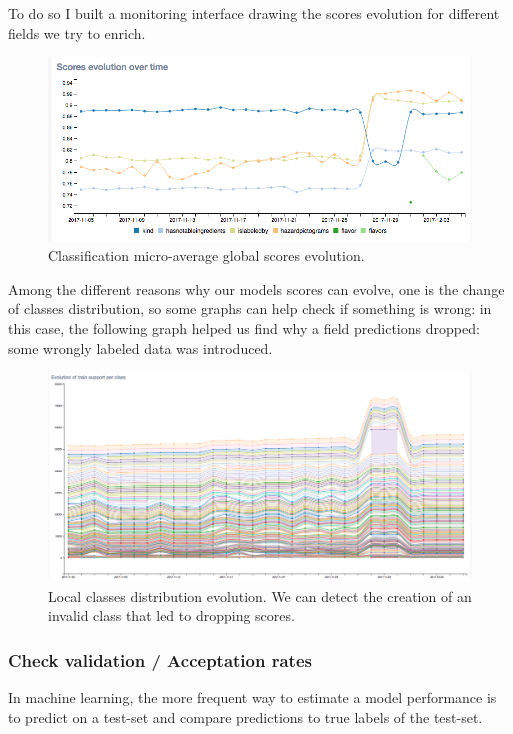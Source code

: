 To do so I built a monitoring interface drawing the scores evolution for different fields we try to enrich.
\begin{figure}[H]
\centering
\includegraphics[scale=0.50]{./images/monitoring/global-scores-evolution-2.png}
\caption{Classification micro-average global scores evolution.}
\end{figure}

Among the different reasons why our models scores can evolve, one is the change of classes distribution, so some graphs can help check if something is wrong: in this case, the following graph helped us find why a field predictions dropped: some wrongly labeled data was introduced.

\begin{figure}[H]
\centering
\includegraphics[scale=0.30]{./images/monitoring/local-classes-evolution.png}
\caption{Local classes distribution evolution. We can detect the creation of an invalid class that led to dropping scores.}
\end{figure}


\subsubsection{Check validation / Acceptation rates}

In machine learning, the more frequent way to estimate a model performance is to predict on a test-set and compare predictions to true labels of the test-set.

